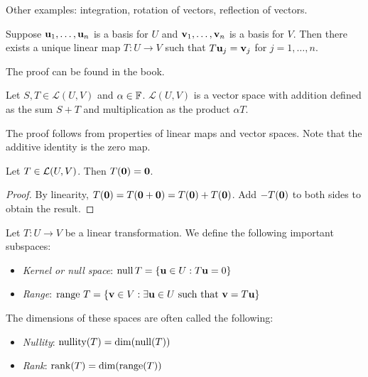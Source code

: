 \documentclass{article}
\begin{document}
Other examples: integration, rotation of vectors, reflection of vectors.

\begin{theorem}
\label{thm:unique_map}
Suppose ${\mathbf{u}}_1, \ldots, {\mathbf{u}}_n$ is a basis for $U$ and ${\mathbf{v}}_1, \ldots, {\mathbf{v}}_n$ is a basis for $V$. Then there exists a unique linear map $T:U \to V$ such that $T {\mathbf{u}}_j = {\mathbf{v}}_j$ for $j=1,\ldots, n$.
\end{theorem}

The proof can be found in the book.

\begin{theorem}
Let $S,T \in \mathcal{L}(U,V)$ and $\alpha \in {\mathbb{F}}$. $\mathcal{L}(U,V)$ is a vector space with addition defined as the sum $S+T$ and multiplication as the product $\alpha T$.
\end{theorem}

The proof follows from properties of linear maps and vector spaces. Note that the additive identity is the zero map.


\begin{lemma}
\label{lemm:map_0}
Let $T \in {\mathcal{L}}(U,V)$. Then $T({\mathbf{0}}) = {\mathbf{0}}$.
\end{lemma}
\begin{proof}
By linearity, $T({\mathbf{0}}) = T({\mathbf{0}}+{\mathbf{0}}) = T({\mathbf{0}}) + T({\mathbf{0}})$. Add $-T({\mathbf{0}})$ to both sides to obtain the result.
\end{proof}

\begin{definition}
Let $T:U \to V$ be a linear transformation. We define the following important subspaces:
\begin{itemize}
\item \emph{Kernel or null space}: $\operatorname{null} T = \{{\mathbf{u}} \in U : T{\mathbf{u}} = 0 \}$
\item \emph{Range}: $\operatorname{range} \, T = \{{\mathbf{v}} \in V : \exists {\mathbf{u}} \in U \text{ such that } {\mathbf{v}} = T {\mathbf{u}} \}$
\end{itemize}
The dimensions of these spaces are often called the following:
\begin{itemize}
\item \emph{Nullity}: $\operatorname{nullity}(T) = \dim(\operatorname{null}(T))$
\item \emph{Rank}: $\operatorname{rank}(T) = \dim(\operatorname{range}(T))$
\end{itemize}
\end{definition}
\end{document}
